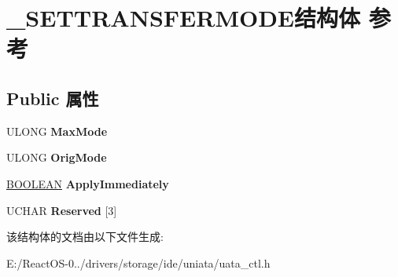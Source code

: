 \hypertarget{struct___s_e_t_t_r_a_n_s_f_e_r_m_o_d_e}{}\section{\+\_\+\+S\+E\+T\+T\+R\+A\+N\+S\+F\+E\+R\+M\+O\+D\+E结构体 参考}
\label{struct___s_e_t_t_r_a_n_s_f_e_r_m_o_d_e}
\subsection*{Public 属性}
\begin{DoxyCompactItemize}
\item 
\mbox{\label{struct___s_e_t_t_r_a_n_s_f_e_r_m_o_d_e_a7899385ae8229c1f9ebbc503faadc14a}} 
U\+L\+O\+NG {\bfseries Max\+Mode}
\item 
\mbox{\label{struct___s_e_t_t_r_a_n_s_f_e_r_m_o_d_e_a93f69ed9aa367d2330ae4843a7879695}} 
U\+L\+O\+NG {\bfseries Orig\+Mode}
\item 
\mbox{\label{struct___s_e_t_t_r_a_n_s_f_e_r_m_o_d_e_a51a81aa2e5a611a53e51de5169becaa3}} 
\hyperlink{_processor_bind_8h_a112e3146cb38b6ee95e64d85842e380a}{B\+O\+O\+L\+E\+AN} {\bfseries Apply\+Immediately}
\item 
\mbox{\label{struct___s_e_t_t_r_a_n_s_f_e_r_m_o_d_e_aeb0c5d71c9c050e35af32511a2949777}} 
U\+C\+H\+AR {\bfseries Reserved} \mbox{[}3\mbox{]}
\end{DoxyCompactItemize}


该结构体的文档由以下文件生成\+:\begin{DoxyCompactItemize}
\item 
E\+:/\+React\+O\+S-\/0../drivers/storage/ide/uniata/uata\+\_\+ctl.\+h\end{DoxyCompactItemize}

